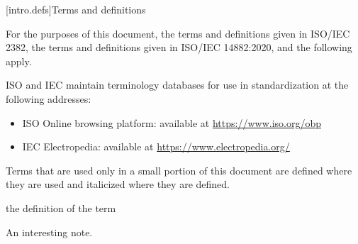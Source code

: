 
[intro.defs]{Terms and definitions}

\pnum
{}%
For the purposes of this document,
the terms and definitions given in ISO/IEC 2382,
the terms and definitions given in ISO/IEC 14882:2020,
and the following apply.

\pnum
ISO and IEC maintain terminology databases for use in standardization
at the following addresses:
\begin{itemize}
\item ISO Online browsing platform: available at \url{https://www.iso.org/obp}
\item IEC Electropedia: available at \url{https://www.electropedia.org/}
\end{itemize}

\pnum
Terms that are used only in a small portion of this document are defined where
they are used and italicized where they are defined.


%
the definition of the term

\begin{defnote}
An interesting note.
\end{defnote}


